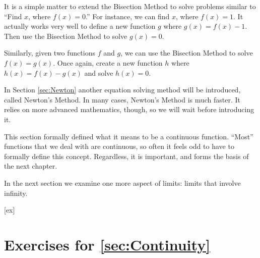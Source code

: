 It is a simple matter to extend the Bisection Method to solve problems similar to ``Find $x$, where $f(x) = 0$.'' For instance, we can find $x$, where $f(x) = 1$. %
It actually works very well to define a new function $g$ where $g(x) = f(x) - 1$. Then use the Bisection Method to solve $g(x)=0$.  
 

Similarly, given two functions $f$ and $g$, we can use the Bisection Method to solve $f(x) = g(x)$. Once again, create a new function $h$ where $h(x) = f(x)-g(x)$ and solve $h(x) = 0$. 

In Section \ref{sec:Newton} another equation solving method will be introduced, called Newton's Method. In many cases, Newton's Method is much faster. It relies on more advanced mathematics, though, so we will wait before introducing it. 

This section formally defined what it means to be a continuous function. ``Most'' functions that we deal with are continuous, so often it feels odd to have to formally define this concept. Regardless, it is important, and forms the basis of the next chapter.

In the next section we examine one more aspect of limits: limits that involve infinity.


%
%


[ex]
\section*{Exercises for \ref{sec:Continuity}}



